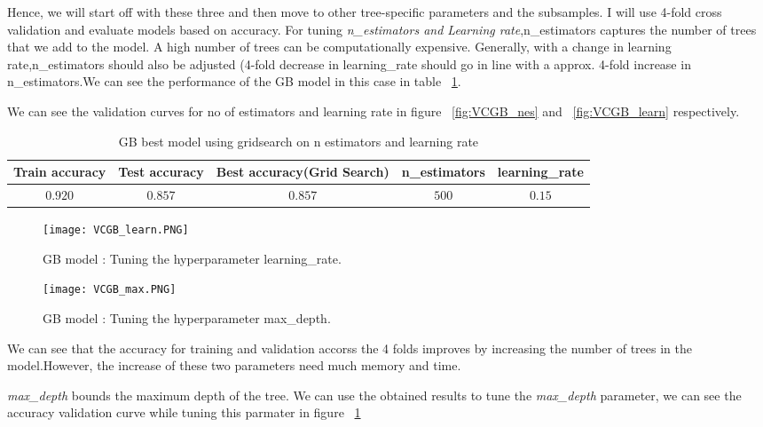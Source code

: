 \documentclass{article}
\begin{document}
Hence, we will start off with these three and then move to other tree-specific parameters and the subsamples. I will use 4-fold cross validation and evaluate models based on accuracy. 
For tuning \textit{n\_estimators and Learning rate},n\_estimators captures the number of trees that we add to the model. A high number of trees can be computationally expensive. Generally, with a change in learning rate,n\_estimators should also be adjusted (4-fold decrease in learning\_rate should go in line with a approx. 4-fold increase in n\_estimators.We can see the performance of the GB model in this case in table ~\ref{table:4}.

We can see the validation curves for no of estimators and learning rate in figure ~\ref{fig:VCGB_nes} and ~\ref{fig:VCGB_learn} respectively.
\begin{table}[H]
	\centering
	\begin{tabular}{|c| c| c| c| c|} 
		\hline
		Train accuracy & Test accuracy & Best accuracy(Grid Search)  & n\_estimators& learning\_rate \\ 
		\hline\hline
		$0.920$ & $0.857$ & $0.857$ & $500$ &$ 0.15$ \\ 
		\hline
	\end{tabular}
	\caption{{\small GB best model using gridsearch on n estimators and learning rate }}
	\label{table:4}
\end{table}


\begin{figure}[H]
	\centering
	\begin{minipage}{0.45\textwidth}
	\centering
	\texttt{[image: VCGB\_learn.PNG]}\caption{{\small GB model : Tuning the hyperparameter learning\_rate. }}
	\label{fig:VCGB_learn}
	\end{minipage}\hfill
	\begin{minipage}{0.45\textwidth}
		\centering
		\texttt{[image: VCGB\_max.PNG]}\caption{{\small GB model : Tuning the hyperparameter max\_depth. }}
		\label{fig:VCGB_max}
	\end{minipage}
\end{figure}
We can see that the accuracy for training and validation accorss the 4 folds improves by increasing the number of trees in the model.However, the increase of these two parameters need much memory and time.

\textit{max\_depth} bounds the maximum depth of the tree. We can use the obtained results to tune the \textit{max\_depth} parameter, we can see the accuracy validation curve while tuning this parmater in figure ~\ref{fig:VCGB_max}
\end{document}
